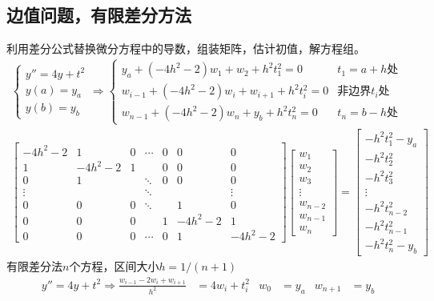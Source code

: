 \documentclass[twocolumn]{article}
\begin{document}
\subsection{边值问题，有限差分方法}
利用差分公式替换微分方程中的导数，组装矩阵，估计初值，解方程组。
\begin{align*}
    \begin{cases}
        y''=4y+t^2 \\
        y(a)=y_a   \\
        y(b)=y_b
    \end{cases}
    \Rightarrow
    \begin{cases}
        y_a+(-4h^2-2)w_1+w_2+h^2t_1^2=0         & t_1=a+h\text{处}          \\
        w_{i-1}+(-4h^2-2)w_i+w_{i+1}+h^2t_i^2=0 & \text{非边界}t_i\text{处} \\
        w_{n-1}+(-4h^2-2)w_n+y_b+h^2t_n^2=0     & t_n=b-h\text{处}
    \end{cases} \\
    \begin{bmatrix}
        -4h^2-2 & 1       & 0 & \cdots & 0 & 0       & 0       \\
        1       & -4h^2-2 & 1 &        & 0 & 0       & 0       \\
        0       & 1       &   & \ddots & 0 & 0       & 0       \\
        \vdots  &         &   & \ddots &   &         & \vdots  \\
        0       & 0       & 0 & \ddots &   & 1       & 0       \\
        0       & 0       & 0 &        & 1 & -4h^2-2 & 1       \\
        0       & 0       & 0 & \cdots & 0 & 1       & -4h^2-2
    \end{bmatrix}
    \begin{bmatrix}
        w_1     \\
        w_2     \\
        w_3     \\
        \vdots  \\
        w_{n-2} \\
        w_{n-1} \\
        w_n
    \end{bmatrix}
    =
    \begin{bmatrix}
        -h^2t_1^2-y_a \\
        -h^2t_2^2     \\
        -h^2t_3^2     \\
        \vdots        \\
        -h^2t_{n-2}^2 \\
        -h^2t_{n-1}^2 \\
        -h^2t_n^2-y_b
    \end{bmatrix}
\end{align*}
有限差分法$n$个方程，区间大小$h=1/(n+1)$
\begin{align*}
    y''=4y+t^2\Rightarrow\frac{w_{i-1}-2w_i+w_{i+1}}{h^2} & =4w_i+t_i^2 & w_0 & =y_a & w_{n+1} & =y_b
\end{align*}
\end{document}
